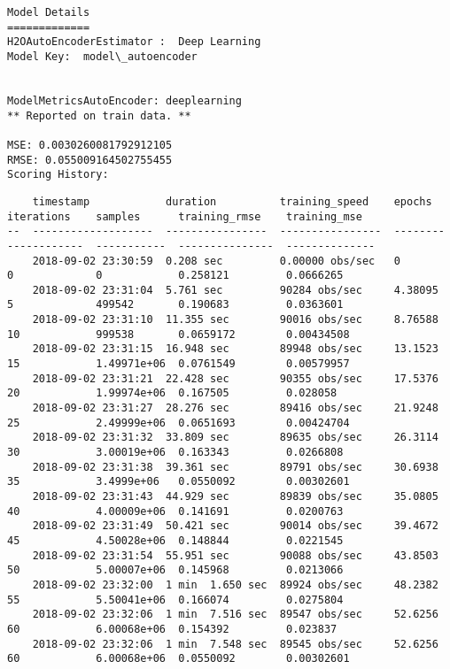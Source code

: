 \documentclass[11pt]{article}
\begin{document}
    \begin{Verbatim}[commandchars=\\\{\}]
Model Details
=============
H2OAutoEncoderEstimator :  Deep Learning
Model Key:  model\_autoencoder


ModelMetricsAutoEncoder: deeplearning
** Reported on train data. **

MSE: 0.0030260081792912105
RMSE: 0.055009164502755455
Scoring History: 

    \end{Verbatim}

    
    \begin{verbatim}
    timestamp            duration          training_speed    epochs    iterations    samples      training_rmse    training_mse
--  -------------------  ----------------  ----------------  --------  ------------  -----------  ---------------  --------------
    2018-09-02 23:30:59  0.208 sec         0.00000 obs/sec   0         0             0            0.258121         0.0666265
    2018-09-02 23:31:04  5.761 sec         90284 obs/sec     4.38095   5             499542       0.190683         0.0363601
    2018-09-02 23:31:10  11.355 sec        90016 obs/sec     8.76588   10            999538       0.0659172        0.00434508
    2018-09-02 23:31:15  16.948 sec        89948 obs/sec     13.1523   15            1.49971e+06  0.0761549        0.00579957
    2018-09-02 23:31:21  22.428 sec        90355 obs/sec     17.5376   20            1.99974e+06  0.167505         0.028058
    2018-09-02 23:31:27  28.276 sec        89416 obs/sec     21.9248   25            2.49999e+06  0.0651693        0.00424704
    2018-09-02 23:31:32  33.809 sec        89635 obs/sec     26.3114   30            3.00019e+06  0.163343         0.0266808
    2018-09-02 23:31:38  39.361 sec        89791 obs/sec     30.6938   35            3.4999e+06   0.0550092        0.00302601
    2018-09-02 23:31:43  44.929 sec        89839 obs/sec     35.0805   40            4.00009e+06  0.141691         0.0200763
    2018-09-02 23:31:49  50.421 sec        90014 obs/sec     39.4672   45            4.50028e+06  0.148844         0.0221545
    2018-09-02 23:31:54  55.951 sec        90088 obs/sec     43.8503   50            5.00007e+06  0.145968         0.0213066
    2018-09-02 23:32:00  1 min  1.650 sec  89924 obs/sec     48.2382   55            5.50041e+06  0.166074         0.0275804
    2018-09-02 23:32:06  1 min  7.516 sec  89547 obs/sec     52.6256   60            6.00068e+06  0.154392         0.023837
    2018-09-02 23:32:06  1 min  7.548 sec  89545 obs/sec     52.6256   60            6.00068e+06  0.0550092        0.00302601
    \end{verbatim}
\end{document}
